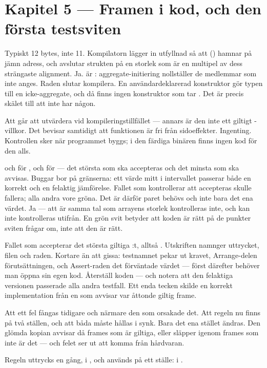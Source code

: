 \section*{Kapitel 5 --- Framen i kod, och den första testsviten}

 Typiskt 12 bytes, inte 11. Kompilatorn lägger in utfyllnad så att 
() hamnar på jämn adress, och avslutar strukten på en storlek som är en
multipel av dess strängaste alignment.
 Ja.  är : aggregate-initiering nollställer de medlemmar som inte
anges.
 Raden slutar kompilera. En användardeklarerad konstruktor gör typen till en icke-aggregate,
och då finns ingen konstruktor som tar . Det är precis skälet till att
 inte har någon.

 Att  går att utvärdera vid kompileringstillfället --- annars är den inte
ett giltigt -villkor. Det bevisar samtidigt att funktionen är fri från
sidoeffekter.
 Ingenting. Kontrollen sker när programmet byggs; i den färdiga binären finns ingen kod för
den alls.

  och  för ,  och  för  --- det
största som ska accepteras och det minsta som ska avvisas. Buggar bor på gränserna: ett värde mitt
i intervallet passerar både en korrekt och en felaktig jämförelse.
 Fallet som kontrollerar att  accepteras skulle fallera; alla andra vore
gröna. Det är därför paret behövs och inte bara det ena värdet.
 Ja --- att  är samma tal som arrayens storlek kontrolleras inte, och
kan inte kontrolleras utifrån. En grön svit betyder att koden är rätt på de punkter sviten frågar
om, inte att den är rätt.

 Fallet som accepterar det största giltiga :t, alltså . Utskriften
namnger uttrycket, filen och raden.
 Kortare än att gissa: testnamnet pekar ut kravet, Arrange-delen förutsättningen, och
Assert-raden det förväntade värdet --- först därefter behöver man öppna sin egen kod.
 Återställ koden --- och notera att den felaktiga versionen passerade alla andra testfall.
Ett enda tecken skilde en korrekt implementation från en som avvisar var åttonde giltig frame.

 Att ett fel fångas tidigare och närmare den som orsakade det.
 Att regeln nu finns på två ställen, och att båda måste hållas i synk.
 Bara det ena stället ändras. Den glömda kopian avvisar då frames som är giltiga, eller
släpper igenom frames som inte är det --- och felet ser ut att komma från hårdvaran.

Regeln uttrycks en gång, i , och används på ett ställe: i .
